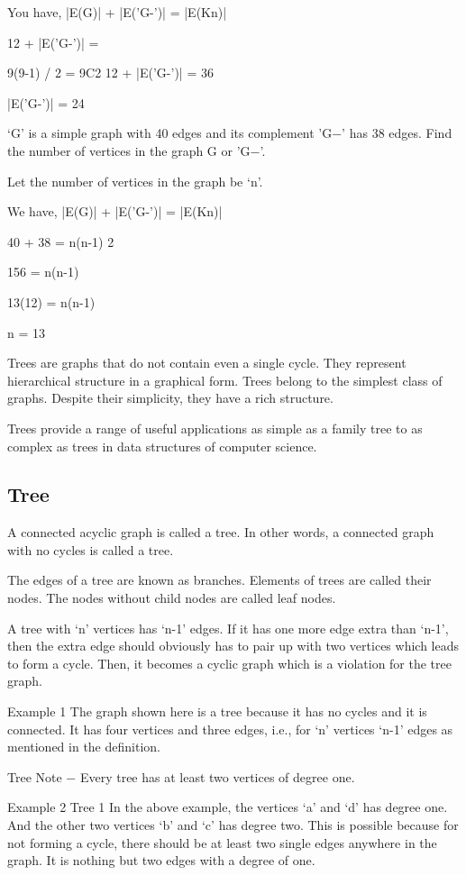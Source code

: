 You have, |E(G)| + |E('G-')| = |E(Kn)|

12 + |E('G-')| = 

9(9-1) / 2 = 9C2
12 + |E('G-')| = 36

|E('G-')| = 24

‘G’ is a simple graph with 40 edges and its complement 'G−' has 38 edges. Find the number of vertices in the graph G or 'G−'.

Let the number of vertices in the graph be ‘n’.

We have, |E(G)| + |E('G-')| = |E(Kn)|

40 + 38 = 
n(n-1)
2

156 = n(n-1)

13(12) = n(n-1)

n = 13

\newpage

Trees are graphs that do not contain even a single cycle. They represent hierarchical structure in a graphical form. Trees belong to the simplest class of graphs. Despite their simplicity, they have a rich structure.

Trees provide a range of useful applications as simple as a family tree to as complex as trees in data structures of computer science.

\subsection{Tree}
A connected acyclic graph is called a tree. In other words, a connected graph with no cycles is called a tree.

The edges of a tree are known as branches. Elements of trees are called their nodes. The nodes without child nodes are called leaf nodes.

A tree with ‘n’ vertices has ‘n-1’ edges. If it has one more edge extra than ‘n-1’, then the extra edge should obviously has to pair up with two vertices which leads to form a cycle. Then, it becomes a cyclic graph which is a violation for the tree graph.

Example 1
The graph shown here is a tree because it has no cycles and it is connected. It has four vertices and three edges, i.e., for ‘n’ vertices ‘n-1’ edges as mentioned in the definition.

Tree
Note − Every tree has at least two vertices of degree one.

Example 2
Tree 1
In the above example, the vertices ‘a’ and ‘d’ has degree one. And the other two vertices ‘b’ and ‘c’ has degree two. This is possible because for not forming a cycle, there should be at least two single edges anywhere in the graph. It is nothing but two edges with a degree of one.

